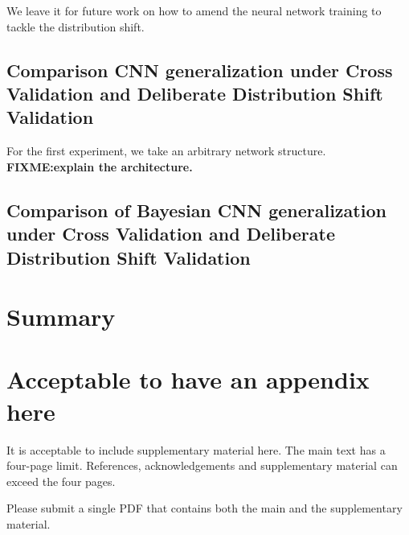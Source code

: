 \documentclass{article}
\begin{document}
We leave it for future work on how to amend the neural network training to tackle the distribution shift.
\subsection{Comparison CNN generalization under Cross Validation and Deliberate Distribution Shift Validation}
For the first experiment, we take an arbitrary network structure. \textbf{FIXME:explain the architecture.}
\subsection{Comparison of Bayesian CNN generalization under Cross Validation and Deliberate Distribution Shift Validation}
\section{Summary}




\appendix
\section{Acceptable to have an appendix here}
It is acceptable to include supplementary material here. 
The main text has a four-page limit. References, acknowledgements and supplementary material can exceed the four pages. 

Please submit a single PDF that contains both the main and the supplementary material. 
\end{document}
